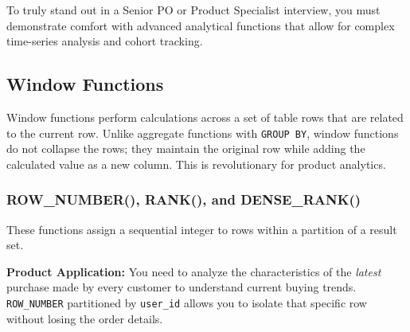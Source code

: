 To truly stand out in a Senior PO or Product Specialist interview, you
must demonstrate comfort with advanced analytical functions that allow
for complex time-series analysis and cohort tracking.

\subsection{Window Functions}\label{window-functions}

Window functions perform calculations across a set of table rows that
are related to the current row. Unlike aggregate functions with
\texttt{GROUP\ BY}, window functions do not collapse the rows; they
maintain the original row while adding the calculated value as a new
column. This is revolutionary for product analytics.

\subsubsection{ROW\_NUMBER(), RANK(), and
DENSE\_RANK()}\label{row_number-rank-and-dense_rank}

These functions assign a sequential integer to rows within a partition
of a result set.

\begin{Shaded}
\begin{Highlighting}[]
\NormalTok{ (}
        \NormalTok{() }\NormalTok{(}  \NormalTok{) }
\OperatorTok{=} \NormalTok{;}
\end{Highlighting}
\end{Shaded}

\textbf{Product Application:} You need to analyze the characteristics of
the \emph{latest} purchase made by every customer to understand current
buying trends. \texttt{ROW\_NUMBER} partitioned by \texttt{user\_id}
allows you to isolate that specific row without losing the order
details.

